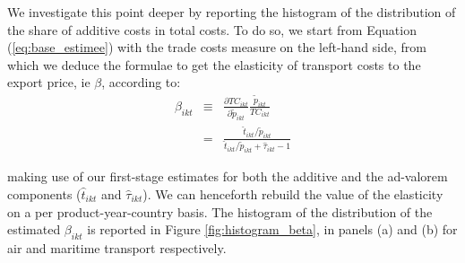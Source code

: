 \documentclass[a4paper,11pt]{article}
\begin{document}
We investigate this point deeper by reporting the histogram of the distribution of the share of additive costs in total costs. To do so, we start from Equation (\ref{eq:base_estimee}) with the trade costs measure on the left-hand side, from which we deduce the formulae to get the elasticity of transport costs to the export price, ie $\beta$, according to:
\begin{eqnarray*}
\beta_{ikt} &\equiv& \frac{\partial TC_{ikt}}{\partial \widetilde{p}_{ikt}}\frac{\widetilde{p}_{ikt}}{TC_{ikt}} \\
&=& \frac{\widehat{t}_{ikt}/\widetilde{p}_{ikt}}{\widehat{t}_{ikt}/\widetilde{p}_{ikt}+\widehat{\tau}_{ikt}-1}
\end{eqnarray*}

\noindent making use of our first-stage estimates for both the additive and the ad-valorem components ($\widehat{t}_{ikt}$ and $\widehat{\tau}_{ikt}$). We can henceforth rebuild the value of the elasticity on a per product-year-country basis. The histogram of the distribution of the estimated $\beta_{ikt}$ is reported in Figure \ref{fig:histogram_beta}, in panels (a) and (b) for air and maritime transport respectively.
\end{document}
